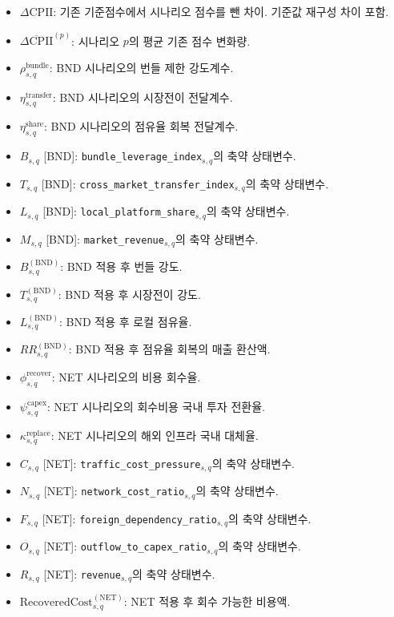 \documentclass[11pt,a4paper]{report}
\begin{document}
\begin{itemize}[leftmargin=1.8em,itemsep=0.35em]
\item \(\Delta \mathrm{CPII}\): 기존 기준점수에서 시나리오 점수를 뺀 차이. 기준값 재구성 차이 포함.
\item \(\overline{\Delta \mathrm{CPII}}^{(p)}\): 시나리오 \(p\)의 평균 기존 점수 변화량.
\item \(\rho^{\mathrm{bundle}}_{s,q}\): BND 시나리오의 번들 제한 강도계수.
\item \(\eta^{\mathrm{transfer}}_{s,q}\): BND 시나리오의 시장전이 전달계수.
\item \(\eta^{\mathrm{share}}_{s,q}\): BND 시나리오의 점유율 회복 전달계수.
\item \(B_{s,q}\) [BND]: \nolinkurl{bundle_leverage_index}\(_{s,q}\)의 축약 상태변수.
\item \(T_{s,q}\) [BND]: \nolinkurl{cross_market_transfer_index}\(_{s,q}\)의 축약 상태변수.
\item \(L_{s,q}\) [BND]: \nolinkurl{local_platform_share}\(_{s,q}\)의 축약 상태변수.
\item \(M_{s,q}\) [BND]: \nolinkurl{market_revenue}\(_{s,q}\)의 축약 상태변수.
\item \(B^{(\mathrm{BND})}_{s,q}\): BND 적용 후 번들 강도.
\item \(T^{(\mathrm{BND})}_{s,q}\): BND 적용 후 시장전이 강도.
\item \(L^{(\mathrm{BND})}_{s,q}\): BND 적용 후 로컬 점유율.
\item \(RR^{(\mathrm{BND})}_{s,q}\): BND 적용 후 점유율 회복의 매출 환산액.
\item \(\phi^{\mathrm{recover}}_{s,q}\): NET 시나리오의 비용 회수율.
\item \(\psi^{\mathrm{capex}}_{s,q}\): NET 시나리오의 회수비용 국내 투자 전환율.
\item \(\kappa^{\mathrm{replace}}_{s,q}\): NET 시나리오의 해외 인프라 국내 대체율.
\item \(C_{s,q}\) [NET]: \nolinkurl{traffic_cost_pressure}\(_{s,q}\)의 축약 상태변수.
\item \(N_{s,q}\) [NET]: \nolinkurl{network_cost_ratio}\(_{s,q}\)의 축약 상태변수.
\item \(F_{s,q}\) [NET]: \nolinkurl{foreign_dependency_ratio}\(_{s,q}\)의 축약 상태변수.
\item \(O_{s,q}\) [NET]: \nolinkurl{outflow_to_capex_ratio}\(_{s,q}\)의 축약 상태변수.
\item \(R_{s,q}\) [NET]: \nolinkurl{revenue}\(_{s,q}\)의 축약 상태변수.
\item \(\mathrm{RecoveredCost}^{(\mathrm{NET})}_{s,q}\): NET 적용 후 회수 가능한 비용액.

\end{itemize}
\end{document}
